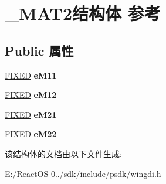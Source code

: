 \hypertarget{struct___m_a_t2}{}\section{\+\_\+\+M\+A\+T2结构体 参考}
\label{struct___m_a_t2}
\subsection*{Public 属性}
\begin{DoxyCompactItemize}
\item 
\mbox{\label{struct___m_a_t2_a6c159f34d9679a16e5a6d02703d591fb}} 
\hyperlink{struct___f_i_x_e_d}{F\+I\+X\+ED} {\bfseries e\+M11}
\item 
\mbox{\label{struct___m_a_t2_a855abe4095197944c1de70680b1ba325}} 
\hyperlink{struct___f_i_x_e_d}{F\+I\+X\+ED} {\bfseries e\+M12}
\item 
\mbox{\label{struct___m_a_t2_a68928d74589e909f0707c6702d829a18}} 
\hyperlink{struct___f_i_x_e_d}{F\+I\+X\+ED} {\bfseries e\+M21}
\item 
\mbox{\label{struct___m_a_t2_a5d6dbcf9c05f1717260fabf4bf45c43f}} 
\hyperlink{struct___f_i_x_e_d}{F\+I\+X\+ED} {\bfseries e\+M22}
\end{DoxyCompactItemize}


该结构体的文档由以下文件生成\+:\begin{DoxyCompactItemize}
\item 
E\+:/\+React\+O\+S-\/0../sdk/include/psdk/wingdi.\+h\end{DoxyCompactItemize}
